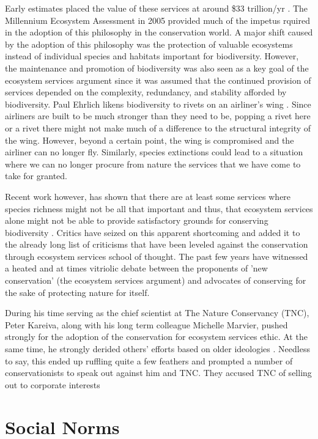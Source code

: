 \documentclass[rutwik_proposal.tex]{subfiles}
\begin{document}
Early estimates placed the value of these services at around \$33 trillion/yr \cite{dArge97}. The Millennium Ecosystem Assessment in 2005 provided much of the impetus rquired in the adoption of this philosophy in the conservation world. A major shift caused by the adoption of this philosophy was the protection of valuable ecosystems instead of individual species and habitats important for biodiversity. However, the maintenance and promotion of biodiversity was also seen as a key goal of the ecosystem services argument since it was assumed that the continued provision of services depended on the complexity, redundancy, and stability afforded by biodiversity. Paul Ehrlich likens biodiversity to rivets on an airliner's wing \cite{Ehrlichs81}. Since airliners are built to be much stronger than they need to be, popping a rivet here or a rivet there might not make much of a difference to the structural integrity of the wing. However, beyond a certain point, the wing is compromised and the airliner can no longer fly. Similarly, species extinctions could lead to a situation where we can no longer procure from nature the services that we have come to take for granted.

Recent work however, has shown that there are at least some services where species richness might not be all that important and thus, that ecosystem services alone might not be able to provide satisfactory grounds for conserving biodiversity \cite{Winfree15}. Critics have seized on this apparent shortcoming and added it to the already long list of criticisms that have been leveled against the conservation through ecosystem services school of thought. The past few years have witnessed a heated and at times vitriolic debate between the proponents of 'new conservation' (the ecosystem services argument) and advocates of conserving for the sake of protecting nature for itself.

During his time serving as the chief scientist at The Nature Conservancy (TNC), Peter Kareiva, along with his long term colleague Michelle Marvier, pushed strongly for the adoption of the conservation for ecosystem services ethic. At the same time, he strongly derided others' efforts based on older ideologies \cite{Kareiva07, Kareiva12}. Needless to say, this ended up ruffling quite a few feathers and prompted a number of conservationists to speak out against him and TNC. They accused TNC of selling out to corporate interests \cite{Soule14}



\section{Social Norms}\label{sec:norms}
\end{document}
